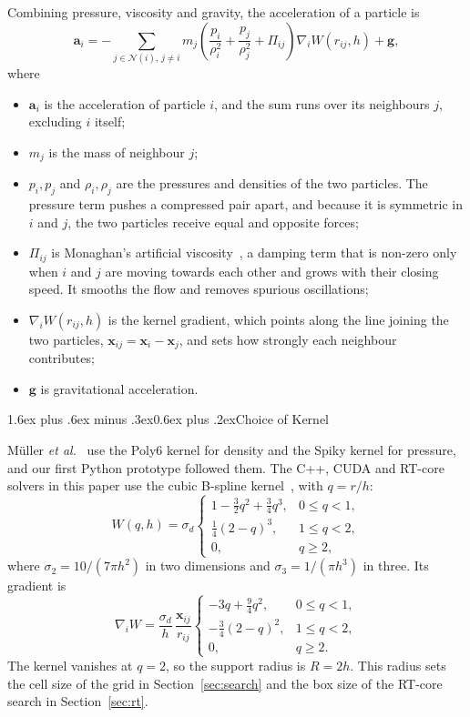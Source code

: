 \documentclass[conference]{IEEEtran}
\makeatletter
\renewcommand\subsection{\@startsection{subsection}{2}{\z@}%
  {1.6ex plus .6ex minus .3ex}{0.6ex plus .2ex}{\normalfont\normalsize\bfseries}}
\makeatother
\begin{document}
Combining pressure, viscosity and gravity, the acceleration of a particle is
\begin{equation}
\mathbf{a}_i = -\sum_{j\in\mathcal{N}(i),\,j\ne i} m_j\left(\frac{p_i}{\rho_i^2}+\frac{p_j}{\rho_j^2}+\Pi_{ij}\right)\nabla_i W(r_{ij},h) + \mathbf{g},
\label{eq:accel}
\end{equation}
where
\begin{itemize}
\item $\mathbf{a}_i$ is the acceleration of particle $i$, and the sum runs over its neighbours $j$, excluding $i$ itself;
\item $m_j$ is the mass of neighbour $j$;
\item $p_i, p_j$ and $\rho_i, \rho_j$ are the pressures and densities of the two particles. The pressure term pushes a compressed pair apart, and because it is symmetric in $i$ and $j$, the two particles receive equal and opposite forces;
\item $\Pi_{ij}$ is Monaghan's artificial viscosity~\cite{monaghan1992}, a damping term that is non-zero only when $i$ and $j$ are moving towards each other and grows with their closing speed. It smooths the flow and removes spurious oscillations;
\item $\nabla_i W(r_{ij},h)$ is the kernel gradient, which points along the line joining the two particles, $\mathbf{x}_{ij}=\mathbf{x}_i-\mathbf{x}_j$, and sets how strongly each neighbour contributes;
\item $\mathbf{g}$ is gravitational acceleration.
\end{itemize}

\subsection{Choice of Kernel}

M\"uller \emph{et al.}~\cite{muller2003particle} use the Poly6 kernel for density and the Spiky kernel for pressure, and our first Python prototype followed them. The C++, CUDA and RT-core solvers in this paper use the cubic B-spline kernel~\cite{monaghan1985}, with $q=r/h$:
\begin{equation}
W(q,h)=\sigma_d
\begin{cases}
1-\tfrac{3}{2}q^2+\tfrac{3}{4}q^3, & 0\le q<1,\\[2pt]
\tfrac{1}{4}(2-q)^3, & 1\le q<2,\\[2pt]
0, & q\ge 2,
\end{cases}
\end{equation}
where $\sigma_2=10/(7\pi h^2)$ in two dimensions and $\sigma_3=1/(\pi h^3)$ in three. Its gradient is
\begin{equation}
\nabla_i W = \frac{\sigma_d}{h}\,\frac{\mathbf{x}_{ij}}{r_{ij}}
\begin{cases}
-3q+\tfrac{9}{4}q^2, & 0\le q<1,\\[2pt]
-\tfrac{3}{4}(2-q)^2, & 1\le q<2,\\[2pt]
0, & q\ge 2.
\end{cases}
\end{equation}
The kernel vanishes at $q=2$, so the support radius is $R=2h$. This radius sets the cell size of the grid in Section~\ref{sec:search} and the box size of the RT-core search in Section~\ref{sec:rt}.
\end{document}
